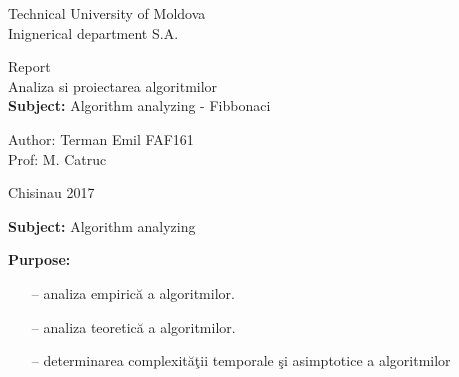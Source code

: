 \documentclass{article}
\begin{document}

	\newcommand{\myIncludeImg}[4]{
		\begin{center} \begin{figure}[!ht]
			\begin{mdframed}[backgroundcolor=black!5, rightline=false, leftline=false]
				\begin{center}
					\texttt{[image: \#2]}
					\caption{#3}
				\end{center}
			\end{mdframed}
			\label{fig:#4}
		\end{figure} \end{center}
	}

	\newcommand{\myCenter}[1]{
		\begin{center}
			#1
		\end{center}
	}

	\makeatletter
	\newenvironment{sqcases} {
		\matrix@check\sqcases\env@sqcases
	}{
		\endarray \right.
	}
	\def\env@sqcases {
		\let \@ifnextchar \new@ifnextchar
		\left \lbrack
		\def \arraystretch{1.2}
		\array{@{}l@{\quad}l@{}}
	}
	\makeatother

	\begin{center}
		Technical University of Moldova\\
		Inignerical department S.A.

		\vfill {\fontsize{100}{1}\selectfont Report}\\
		{\huge Analiza si proiectarea algoritmilor}\\
		{\huge \textbf{Subject:} Algorithm analyzing - Fibbonaci}
		\vfill
	\end{center}
	Author: \hfill Terman Emil FAF161\\
	Prof: \hfill M. Catruc
	\vfill
	\begin{center}
		Chisinau 2017
	\end{center}
	\pagebreak

	\begin{center}
		{\Huge \textbf{Subject:} Algorithm analyzing}
	\end{center}

	{\large \textbf{Purpose:}}
	\begin{itemize}
		\item[--] analiza empirică a algoritmilor.
		\item[--] analiza teoretică a algoritmilor.
		\item[--] determinarea complexităţii temporale şi asimptotice a algoritmilor
	\end{itemize}
\end{document}
